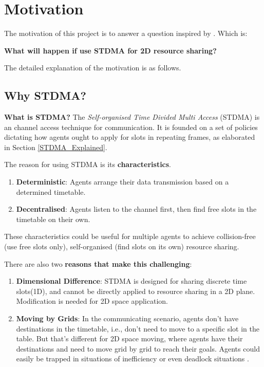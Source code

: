 \documentclass[12pt, oneside]{article}
\begin{document}
\section{Motivation}

The motivation of this project is to answer a question inspired by \cite{Paper_From_Supervisor}. Which is:

\label{Question}

\begin{displayquote}
\textbf{What will happen if use STDMA for 2D resource sharing?}
\end{displayquote}

The detailed explanation of the motivation is as follows.

\subsection{Why STDMA?}
\label{Why STDMA}
\textbf{What is STDMA?} The \textit{Self-organised Time Divided Multi Access} (STDMA) is an channel access technique for communication. It is founded on a set of policies dictating how agents ought to apply for slots in repeating frames, as elaborated in Section \ref{STDMA_Explained}.

The reason for using STDMA is its \textbf{characteristics}\cite{STDMA_characteristic}. 
\begin{enumerate}
    \item \textbf{Deterministic}: Agents arrange their data transmission based on a determined timetable.
    \item \textbf{Decentralised}: Agents listen to the channel first, then find free slots in the timetable on their own.
\end{enumerate}

These characteristics could be useful for multiple agents to achieve collision-free (use free slots only), self-organised (find slots on its own) resource sharing.

There are also two \textbf{reasons that make this challenging}:
\begin{enumerate}
    \item \textbf{Dimensional Difference}: STDMA is designed for sharing discrete time slots(1D), and cannot be directly applied to resource sharing in a 2D plane. Modification is needed for 2D space application.
    \item \textbf{Moving by Grids}: In the communicating scenario, agents don't have destinations in the timetable, i.e., don't need to move to a specific slot in the table. But that's different for 2D space moving, where agents have their destinations and need to move grid by grid to reach their goals. Agents could easily be trapped in situations of inefficiency or even deadlock situations \cite{MAPF_Deadlock_Explain1,MAPF_Deadlock_Explain2}.
\end{enumerate}
\end{document}
